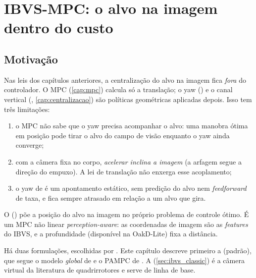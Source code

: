\chapter{IBVS-MPC: o alvo na imagem dentro do custo}
\label{cap:ibvs_mpc}

\section{Motivação}
Nas leis dos capítulos anteriores, a centralização do alvo na imagem fica \emph{fora} do
controlador. O MPC (\autoref{cap:mpc}) calcula só a translação; o yaw
() e o canal vertical (,
\autoref{cap:centralizacao}) são políticas geométricas aplicadas depois. Isso tem três limitações:
\begin{enumerate}
  \item o MPC não sabe que o yaw precisa acompanhar o alvo: uma manobra ótima em posição pode
        tirar o alvo do campo de visão enquanto o yaw ainda converge;
  \item com a câmera fixa no corpo, \emph{acelerar inclina a imagem} (a arfagem segue a direção
        do empuxo). A lei de translação não enxerga esse acoplamento;
  \item o yaw de  é um apontamento estático, sem predição do alvo nem
        \emph{feedforward} de taxa, e fica sempre atrasado em relação a um alvo que gira.
\end{enumerate}
O  () põe a posição do alvo na imagem
no próprio problema de controle ótimo. É um MPC não linear \emph{perception-aware}: as coordenadas
de imagem são as \emph{features} do IBVS, e a profundidade (disponível na OakD-Lite) fixa a
distância.

Há duas formulações, escolhidas por . Este capítulo descreve primeiro a
 (padrão), que segue o modelo \emph{global} de \cite{allibert2010vpc} e o
PAMPC de \cite{falanga2018pampc}. A  (\autoref{sec:ibvs_classic}) é a câmera
virtual da literatura de quadrirrotores \cite{sheng2019msc,zhang2021rnmpc} e serve de linha de
base.

